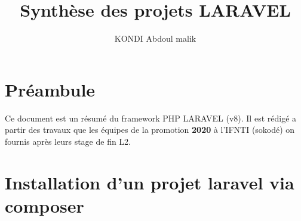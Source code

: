 \documentclass[12pt,a4paper]{article}
\author{KONDI Abdoul malik }
\title{Synthèse des projets LARAVEL}
\begin{document}
\maketitle
\tableofcontents
\newpage

\section{Préambule}
Ce document est un résumé du framework PHP LARAVEL (v8). Il est rédigé a partir des travaux
que les équipes de la promotion \textbf{2020} à l'IFNTI (sokodé) on fournis après leurs  stage de fin L2.\\

\newpage
\section{Installation d'un projet laravel via composer}
\end{document}
